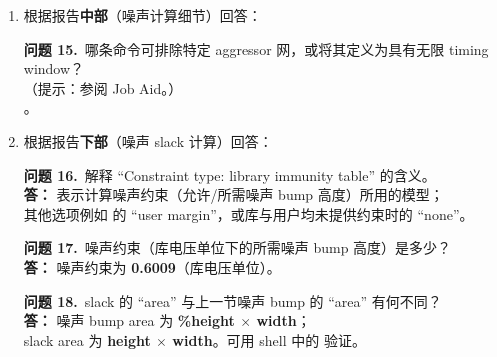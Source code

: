 \begin{enumerate}
\begin{questionBox}
\textbf{问题 12.}\ 解释 ``Steady state resistance source: library set iv curve'' 的含义。\\[0.35em]
\textbf{答：} 表示计算噪声 bump 高度时，驱动输出稳态 I-V 特性所用的模型；\\
其他选项例如  设置的 ``user set value''，
或 PrimeTime 估计线性电阻时的 ``estimation set value''。

\textbf{问题 13.}\ 是否对该网应用了噪声 derating 因子？是否与运行脚本一致？\\[0.35em]
\textbf{答：} \textbf{是}。高度与宽度缩放因子均为 \textbf{1.5}，与运行脚本一致。

\textbf{问题 14.}\ 解释 ``noise effort threshold'' 的含义。\\[0.35em]
\textbf{答：} 噪声 bump 高度大于轨到轨电压的 \textbf{0.2} 倍（亦为默认值）的网，
将使用基于 Arnoldi 阶约化的更复杂计算器。
\end{questionBox}

  \item 根据报告\textbf{中部}（噪声计算细节）回答：
\begin{questionBox}
\textbf{问题 15.}\ 哪条命令可排除特定 aggressor 网，或将其定义为具有无限 timing window？\\
（提示：参阅 Job Aid。）\\[0.35em]
。
\end{questionBox}

  \item 根据报告\textbf{下部}（噪声 slack 计算）回答：
\begin{questionBox}
\textbf{问题 16.}\ 解释 ``Constraint type: library immunity table'' 的含义。\\[0.35em]
\textbf{答：} 表示计算噪声约束（允许/所需噪声 bump 高度）所用的模型；\\
其他选项例如  的 ``user margin''，或库与用户均未提供约束时的 ``none''。

\textbf{问题 17.}\ 噪声约束（库电压单位下的所需噪声 bump 高度）是多少？\\[0.35em]
\textbf{答：} 噪声约束为 \textbf{0.6009}（库电压单位）。

\textbf{问题 18.}\ slack 的 ``area'' 与上一节噪声 bump 的 ``area'' 有何不同？\\[0.35em]
\textbf{答：} 噪声 bump area 为 \textbf{\%height $\times$ width}；\\
slack area 为 \textbf{height $\times$ width}。可用 shell 中的  验证。
\end{questionBox}


\end{enumerate}
